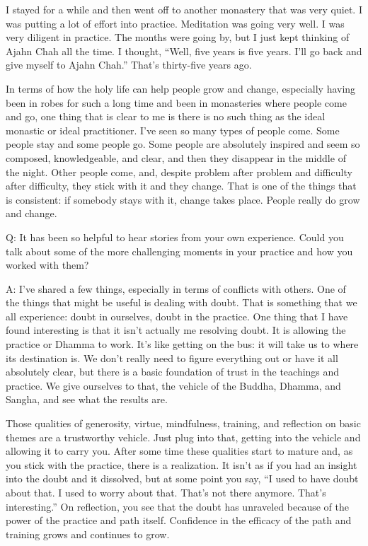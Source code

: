 I stayed for a while and then went off to another monastery that was
very quiet. I was putting a lot of effort into practice. Meditation was
going very well. I was very diligent in practice. The months were going
by, but I just kept thinking of Ajahn Chah all the time. I thought,
“Well, five years is five years. I’ll go back and give myself to Ajahn
Chah.” That’s thirty-five years ago.

In terms of how the holy life can help people grow and change,
especially having been in robes for such a long time and been in
monasteries where people come and go, one thing that is clear to me is
there is no such thing as the ideal monastic or ideal practitioner. I’ve
seen so many types of people come. Some people stay and some people go.
Some people are absolutely inspired and seem so composed, knowledgeable,
and clear, and then they disappear in the middle of the night. Other
people come, and, despite problem after problem and difficulty after
difficulty, they stick with it and they change. That is one of the
things that is consistent: if somebody stays with it, change takes
place. People really do grow and change.

\qaspace
Q: It has been so helpful to hear stories from your own experience.
Could you talk about some of the more challenging moments in your
practice and how you worked with them?

\qaspace
A: I’ve shared a few things, especially in terms of conflicts with
others. One of the things that might be useful is dealing with doubt.
That is something that we all experience: doubt in ourselves, doubt in
the practice. One thing that I have found interesting is that it isn’t
actually me resolving doubt. It is allowing the practice or Dhamma to
work. It’s like getting on the bus: it will take us to where its
destination is. We don’t really need to figure everything out or have it
all absolutely clear, but there is a basic foundation of trust in the
teachings and practice. We give ourselves to that, the vehicle of the
Buddha, Dhamma, and Sangha, and see what the results are.

Those qualities of generosity, virtue, mindfulness, training, and
reflection on basic themes are a trustworthy vehicle. Just plug into
that, getting into the vehicle and allowing it to carry you. After some
time these qualities start to mature and, as you stick with the
practice, there is a realization. It isn’t as if you had an insight into
the doubt and it dissolved, but at some point you say, “I used to have
doubt about that. I used to worry about that. That’s not there anymore.
That’s interesting.” On reflection, you see that the doubt has unraveled
because of the power of the practice and path itself. Confidence in the
efficacy of the path and training grows and continues to grow.

